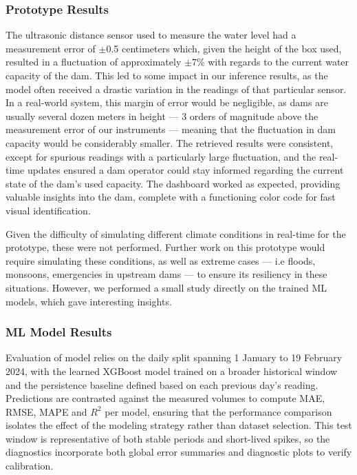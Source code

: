 \subsubsection{Prototype Results}
The ultrasonic distance sensor used to measure the water level had a measurement error of $\pm$0.5 centimeters which, given the height of the box used, resulted in a fluctuation of approximately $\pm7\%$ with regards to the current water capacity of the dam. This led to some impact in our inference results, as the model often received a drastic variation in the readings of that particular sensor. In a real-world system, this margin of error would be negligible, as dams are usually several dozen meters in height --- 3 orders of magnitude above the measurement error of our instruments --- meaning that the fluctuation in dam capacity would be considerably smaller. The retrieved results were consistent, except for spurious readings with a particularly large fluctuation, and the real-time updates ensured a dam operator could stay informed regarding the current state of the dam's used capacity. The dashboard worked as expected, providing valuable insights into the dam, complete with a functioning color code for fast visual identification.


Given the difficulty of simulating different climate conditions in real-time for the prototype, these were not performed. Further work on this prototype would require simulating these conditions, as well as extreme cases --- i.e floods, monsoons, emergencies in upstream dams --- to ensure its resiliency in these situations. However, we performed a small study directly on the trained ML models, which gave interesting insights.

\subsubsection{ML Model Results}
Evaluation of model relies on the daily split spanning 1 January to 19 February 2024, with the learned XGBoost model trained on a broader historical window and the persistence baseline defined based on each previous day's reading. Predictions are contrasted against the measured volumes to compute MAE, RMSE, MAPE and $R^2$ per model, ensuring that the performance comparison isolates the effect of the modeling strategy rather than dataset selection. This test window is representative of both stable periods and short-lived spikes, so the diagnostics incorporate both global error summaries and diagnostic plots to verify calibration.

